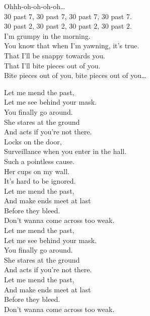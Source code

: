 Ohhh-oh-oh-oh-oh… \\

30 past 7, 30 past 7, 30 past 7, 30 past 7. \\
30 past 2, 30 past 2, 30 past 2, 30 past 2. \\
I'm grumpy in the morning. \\
You know that when I'm yawning, it's true. \\

That I'll be snappy towards you. \\
That I'll bite pieces out of you. \\

Bite pieces out of you, bite pieces out of you… \\





Let me mend the past, \\
Let me see behind your mask. \\
You finally go around. \\
She stares at the ground \\
And acts if you're not there. \\

Locks on the door, \\
Surveillance when you enter in the hall. \\
Such a pointless cause. \\
Her cups on my wall. \\
It's hard to be ignored. \\

Let me mend the past, \\
And make ends meet at last \\
Before they bleed. \\
Don't wanna come across too weak. \\

Let me mend the past, \\
Let me see behind your mask. \\
You finally go around. \\
She stares at the ground \\
And acts if you're not there. \\

Let me mend the past, \\
And make ends meet at last \\
Before they bleed. \\
Don't wanna come across too weak. \\

